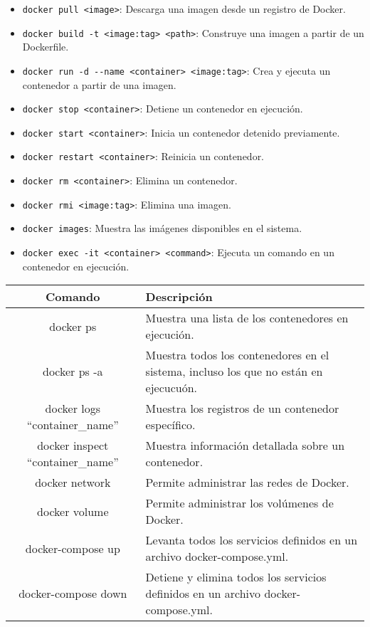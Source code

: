 \documentclass{article}
\begin{document}
\begin{itemize}
  \item \lstinline{docker pull <image>}: Descarga una imagen desde un registro de Docker.
  
  \item \lstinline{docker build -t <image:tag> <path>}: Construye una imagen a partir de un Dockerfile.
  
  \item \lstinline{docker run -d --name <container> <image:tag>}: Crea y ejecuta un contenedor a partir de una imagen.
  
  \item \lstinline{docker stop <container>}: Detiene un contenedor en ejecución.
  
  \item \lstinline{docker start <container>}: Inicia un contenedor detenido previamente.
  
  \item \lstinline{docker restart <container>}: Reinicia un contenedor.
  
  \item \lstinline{docker rm <container>}: Elimina un contenedor.
  
  \item \lstinline{docker rmi <image:tag>}: Elimina una imagen.
  
  \item \lstinline{docker images}: Muestra las imágenes disponibles en el sistema.
  
  \item \lstinline{docker exec -it <container> <command>}: Ejecuta un comando en un contenedor en ejecución.
\end{itemize}

\begin{center}
\begin{tabular}{|c|p{13cm}|}
\hline
\textbf{Comando} & \textbf{Descripción} \\
\hline
docker ps & Muestra una lista de los contenedores en ejecución.\\
\hline
docker ps -a & Muestra todos los contenedores en el sistema, incluso los que no están en ejecucuón. \\
\hline
docker logs \enquote{container\_name} & Muestra los registros de un contenedor específico. \\
\hline
docker inspect \enquote{container\_name} & Muestra información detallada sobre un contenedor. \\
\hline
docker network & Permite administrar las redes de Docker. \\
\hline
docker volume & Permite administrar los volúmenes de Docker. \\
\hline
docker-compose up & Levanta todos los servicios definidos en un archivo docker-compose.yml. \\
\hline
docker-compose down & Detiene y elimina todos los servicios definidos en un archivo docker-compose.yml. \\
\hline
\end{tabular}
\end{center}
\end{document}
